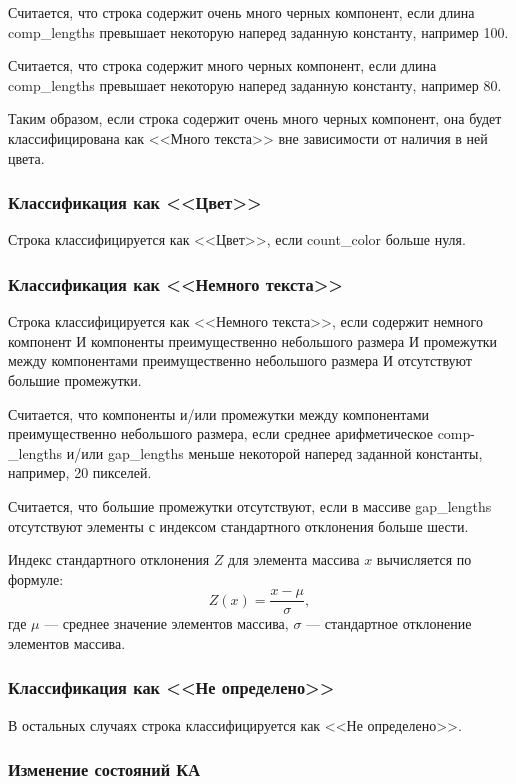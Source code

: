 Считается, что строка содержит очень много черных компонент, если длина comp\_lengths превышает некоторую наперед заданную константу, например 100.

Считается, что строка содержит много черных компонент, если длина comp\_lengths превышает некоторую наперед заданную константу, например 80.

Таким образом, если строка содержит очень много черных компонент, она будет классифицирована как <<Много текста>> вне зависимости от наличия в ней цвета.

\subsubsection*{Классификация как <<Цвет>>}

Строка классифицируется как <<Цвет>>, если count\_color больше нуля.

\subsubsection*{Классификация как <<Немного текста>>}

Строка классифицируется как <<Немного текста>>, если содержит немного компонент И компоненты преимущественно небольшого размера И промежутки между компонентами преимущественно небольшого размера И отсутствуют большие промежутки.

Считается, что компоненты и/или промежутки между компонентами преимущественно небольшого размера, если среднее арифметическое comp-\_lengths и/или gap\_lengths меньше некоторой наперед заданной константы, например, 20 пикселей.

Считается, что большие промежутки отсутствуют, если в массиве gap\_lengths отсутствуют элементы с индексом стандартного отклонения больше шести.

Индекс стандартного отклонения $Z$ для элемента массива $x$ вычисляется по формуле:
$$
Z(x) = \frac{x - \mu}{\sigma},
$$
где $\mu$ --- среднее значение элементов массива, $\sigma$ --- стандартное отклонение элементов массива.

\subsubsection*{Классификация как <<Не определено>>}

В остальных случаях строка классифицируется как <<Не определено>>.

\subsubsection*{Изменение состояний КА}

